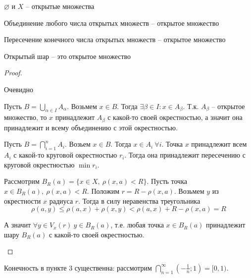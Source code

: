     \begin{Thm}
        \begin{MyList}
            \item $\varnothing$ и $X$ -- открытые множества
            \item Объединение любого числа открытых множеств -- открытое множество
            \item Пересечение конечного числа открытых множеств -- открытое множество
            \item Открытый шар -- это открытое множество  
        \end{MyList}
    \end{Thm}

    \begin{proof}
        \begin{MyList}
            \item Очевидно
            \item Пусть $B = \bigcup_{\alpha \in I} A_\alpha$. Возьмем $x \in B$. Тогда $\exists \beta \in I : x \in A_\beta$. Т.к. $A_\beta$ -- открытое множество, то 
            $x$ принадлежит $A_\beta$ с какой-то своей окрестностью, а значит она принадлежит и всему объединению с этой окрестностью.

            \item Пусть $B = \bigcap_{i = 1}^n A_i$. Возьем $x \in B$. Тогда $x \in A_i \ \forall i$. Точка $x$ принадлежит всем $A_i$ с какой-то круговой окрестностью $r_i$. Тогда она принадлежит пересечению с круговой окрестностью $\min r_i$.    
            \item Рассмотрим $B_R(a) = \{x \in X, \ \rho(x, a) < R\}$. Пусть точка $x \in B_R(a), \ \rho(x, a) < R$. Положим $r = R - \rho(x, a)$. Возьмем $y$ из окрестности $x$ радиуса $r$. Тогда в силу неравенства треугольника
            \[\rho(a, y) \leqslant \rho(a, x) + \rho(x, y) < \rho(a, x) + R - \rho(x, a) = R\]
            \begin{figure}[H]
                \centering
                \def\svgwidth{.3\columnwidth}
                
            \end{figure}

            А значит $\forall y \in V_x(r) \ y \in B_R(a)$, т.е. любая точка $x \in B_R(a)$ принадлежит шару $B_R(a)$ с какой-то своей окрестностью.
        \end{MyList}
    \end{proof}

    \begin{Rem}
        Конечность в пункте 3 существенна: рассмотрим $\bigcap_{n = 1}^\infty \left(-\frac{1}{n}; 1\right) = [0, 1)$. 
    \end{Rem}


